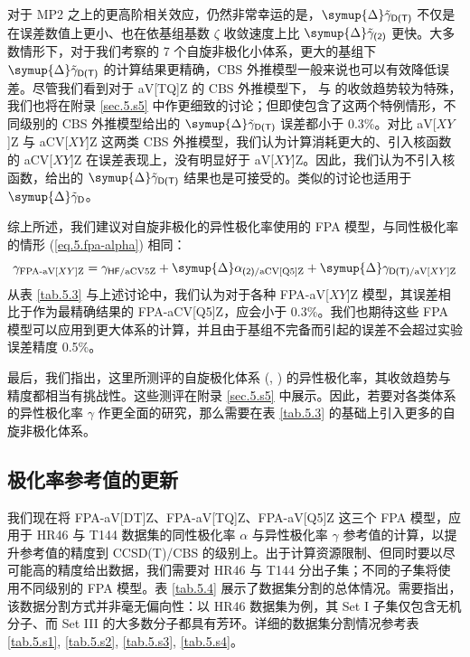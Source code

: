 对于 MP2 之上的更高阶相关效应，仍然非常幸运的是，$\symup{\Delta} \tilde \gamma_\textsf{D(T)}$ 不仅是在误差数值上更小、也在依基组基数 $\zeta$ 收敛速度上比 $\symup{\Delta} \tilde \gamma_\textsf{(2)}$ 更快。大多数情形下，对于我们考察的 7 个自旋非极化小体系，更大的基组下 $\symup{\Delta} \tilde \gamma_\textsf{D(T)}$ 的计算结果更精确，CBS 外推模型一般来说也可以有效降低误差。尽管我们看到对于 aV[TQ]Z 的 CBS 外推模型下， 与  的收敛趋势较为特殊，我们也将在附录 \ref{sec.5.s5} 中作更细致的讨论；但即使包含了这两个特例情形，不同级别的 CBS 外推模型给出的 $\symup{\Delta} \tilde \gamma_\textsf{D(T)}$ 误差都小于 0.3\%。对比 aV[$XY$]Z 与 aCV[$XY$]Z 这两类 CBS 外推模型，我们认为计算消耗更大的、引入核函数的 aCV[$XY$]Z 在误差表现上，没有明显好于 aV[$XY$]Z。因此，我们认为不引入核函数，给出的 $\symup{\Delta} \tilde \gamma_\textsf{D(T)}$ 结果也是可接受的。类似的讨论也适用于 $\symup{\Delta} \tilde \gamma_\textsf{D}$。

综上所述，我们建议对自旋非极化的异性极化率使用的 FPA 模型，与同性极化率的情形 (\ref{eq.5.fpa-alpha}) 相同：
\begin{equation}
    \label{eq.5.fpa-gamma}
    \gamma_{\text{FPA-aV[}XY\text{]Z}} = \gamma_{\textsf{HF}/\text{aCV5Z}} + \symup{\Delta} \alpha_{\textsf{(2)}/\text{aCV[Q5]Z}} + \symup{\Delta} \gamma_{\textsf{D(T)}/\text{aV[}XY\text{]Z}}
\end{equation}
从表 \ref{tab.5.3} 与上述讨论中，我们认为对于各种 FPA-aV[$XY$]Z 模型，其误差相比于作为最精确结果的 FPA-aCV[Q5]Z，应会小于 0.3\%。我们也期待这些 FPA 模型可以应用到更大体系的计算，并且由于基组不完备而引起的误差不会超过实验误差精度 0.5\%。

最后，我们指出，这里所测评的自旋极化体系 (, ) 的异性极化率，其收敛趋势与精度都相当有挑战性。这些测评在附录 \ref{sec.5.s5} 中展示。因此，若要对各类体系的异性极化率 $\gamma$ 作更全面的研究，那么需要在表 \ref{tab.5.3} 的基础上引入更多的自旋非极化体系。

\subsection{极化率参考值的更新}

我们现在将 FPA-aV[DT]Z、FPA-aV[TQ]Z、FPA-aV[Q5]Z 这三个 FPA 模型，应用于 HR46 与 T144 数据集的同性极化率 $\alpha$ 与异性极化率 $\gamma$ 参考值的计算，以提升参考值的精度到 CCSD(T)/CBS 的级别上。出于计算资源限制、但同时要以尽可能高的精度给出数据，我们需要对 HR46 与 T144 分出子集；不同的子集将使用不同级别的 FPA 模型。表 \ref{tab.5.4} 展示了数据集分割的总体情况。需要指出，该数据分割方式并非毫无偏向性：以 HR46 数据集为例，其 Set I 子集仅包含无机分子、而 Set III 的大多数分子都具有芳环。详细的数据集分割情况参考表 \ref{tab.5.s1}, \ref{tab.5.s2}, \ref{tab.5.s3}, \ref{tab.5.s4}。

